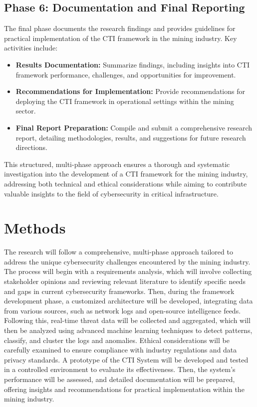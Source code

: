 \documentclass[a4paper,twoside,12pt]{report}
\begin{document}
\subsection{Phase 6: Documentation and Final Reporting}
The final phase documents the research findings and provides guidelines for practical implementation of the CTI framework in the mining industry. Key activities include:
\begin{itemize}
    \item \textbf{Results Documentation:} Summarize findings, including insights into CTI framework performance, challenges, and opportunities for improvement.
    \item \textbf{Recommendations for Implementation:} Provide recommendations for deploying the CTI framework in operational settings within the mining sector.
    \item \textbf{Final Report Preparation:} Compile and submit a comprehensive research report, detailing methodologies, results, and suggestions for future research directions.
\end{itemize}

This structured, multi-phase approach ensures a thorough and systematic investigation into the development of a CTI framework for the mining industry, addressing both technical and ethical considerations while aiming to contribute valuable insights to the field of cybersecurity in critical infrastructure.


\section{Methods}
The research will follow a comprehensive, multi-phase approach tailored to address the unique cybersecurity challenges encountered by the mining industry. The process will begin with a requirements analysis, which will involve collecting stakeholder opinions and reviewing relevant literature to identify specific needs and gaps in current cybersecurity frameworks. Then, during the framework development phase, a customized architecture will be developed, integrating data from various sources, such as network logs and open-source intelligence feeds. Following this, real-time threat data will be collected and aggregated, which will then be analyzed using advanced machine learning techniques to detect patterns, classify, and cluster the logs and anomalies. Ethical considerations will be carefully examined to ensure compliance with industry regulations and data privacy standards. A prototype of the CTI System will be developed and tested in a controlled environment to evaluate its effectiveness. Then, the system’s performance will be assessed, and detailed documentation will be prepared, offering insights and recommendations for practical implementation within the mining industry.
\end{document}
